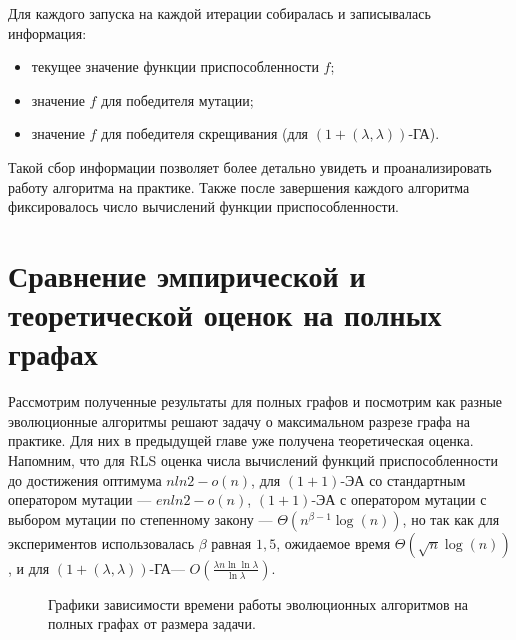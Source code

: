 \documentclass[times]{itmo-student-thesis}
\newcommand{\alglambdaf}{${(1 + (\lambda , \lambda))}$-ГА\xspace}
\newcommand{\oea}{\mbox{$(1 + 1)$-ЭА}\xspace}
\begin{document}
Для каждого запуска на каждой итерации собиралась и записывалась  информация:
\begin{itemize}
 \item текущее значение функции приспособленности $f$;
 \item значение $f$ для победителя мутации;
 \item значение $f$ для победителя скрещивания (для \alglambdaf).
\end{itemize}

Такой сбор информации позволяет более детально увидеть и проанализировать работу алгоритма на практике.
Также после завершения каждого алгоритма фиксировалось число вычислений функции приспособленности.

\section{Сравнение эмпирической и теоретической оценок на полных графах}

Рассмотрим полученные результаты для полных графов и посмотрим как разные эволюционные алгоритмы решают задачу о максимальном разрезе графа на практике.
Для них в предыдущей главе уже получена теоретическая оценка.
Напомним, что для RLS оценка числа вычислений функций приспособленности до достижения оптимума $nln2 - o(n)$, для \oea со стандартным оператором мутации --- $enln2 - o(n)$, \oea с оператором мутации с выбором мутации по степенному закону --- $\Theta(n^{\beta - 1}\log(n))$, но так как для экспериментов использовалась $\beta$ равная $1,5$, ожидаемое время $\Theta(\sqrt{n}\log(n))$, и для \alglambdaf --- $O\left(\frac{\lambda n\ln \ln \lambda}{\ln \lambda}\right)$.

\begin{figure}[t!]
\caption{Графики зависимости времени работы эволюционных алгоритмов на полных графах от размера задачи.}
\label{fig:kn}
\end{figure}
\end{document}
